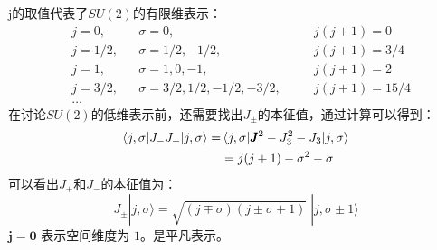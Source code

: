j的取值代表了$SU(2)$的有限维表示：
\begin{align}
& j = 0,   && \sigma = 0,                        && j(j+1) = 0 \nonumber \\
& j = 1/2, && \sigma = 1/2, -1/2,                && j(j+1) = 3/4 \nonumber \\
& j = 1,   && \sigma = 1, 0, -1,                 && j(j+1) = 2 \nonumber \\
& j = 3/2, && \sigma = 3/2, 1/2, -1/2, -3/2, \quad && j(j+1) = 15/4 \nonumber \\
& \dots    &&                               && 
\end{align}
在讨论$SU(2)$的低维表示前，还需要找出$J_\pm$的本征值，通过计算可以得到：
\begin{equation}
    \begin{aligned}
        \braket{j,\sigma|J_-J_+|j,\sigma}=&\braket{j,\sigma|\pmb{J}^2 - J_3^2 - J_3|j,\sigma}\\
        &= j(j+1) - \sigma^2 - \sigma
    \end{aligned}
\end{equation}
可以看出$J_+$和$J_-$的本征值为：    
\begin{equation}
    J_{\pm}|j,\sigma\rangle = \sqrt{(j \mp \sigma)(j \pm \sigma + 1)}\;|j,\sigma \pm 1\rangle
\end{equation}
$\mathbf{j=0}$ 表示空间维度为 $1$。是平凡表示。
\vspace{2ex}

